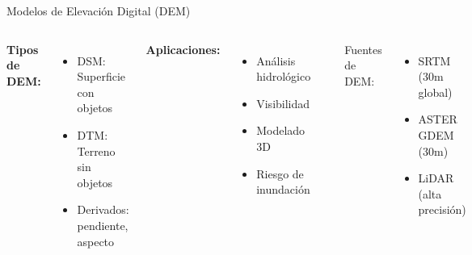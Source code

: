 \documentclass[10pt,aspectratio=169]{beamer}
\begin{document}
\begin{frame}{Modelos de Elevación Digital (DEM)}
    \begin{columns}[T]
        \textbf{Tipos de DEM:}
        \begin{itemize}
            \item DSM: Superficie con objetos
            \item DTM: Terreno sin objetos
            \item Derivados: pendiente, aspecto
        \end{itemize}
        
        \textbf{Aplicaciones:}
        \begin{itemize}
            \item Análisis hidrológico
            \item Visibilidad
            \item Modelado 3D
            \item Riesgo de inundación
        \end{itemize}
        
        \begin{center}
        \end{center}
        
        \vspace{0.3cm}
        \footnotesize
        Fuentes de DEM:
        \begin{itemize}
            \item SRTM (30m global)
            \item ASTER GDEM (30m)
            \item LiDAR (alta precisión)
        \end{itemize}
    \end{columns}
\end{frame}
\end{document}
